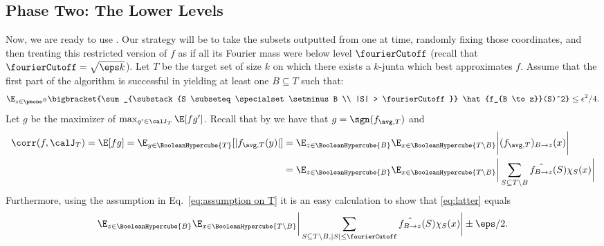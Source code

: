 \subsection{Phase Two: The Lower Levels}
\label{subsection:phase-two-lower-levels}

Now, we are ready to use . Our strategy will be to take the subsets outputted from  one at time, randomly fixing those coordinates, and then treating this restricted version of $f$ as if all its Fourier mass were below level $\fourierCutoff$ (recall that $\fourierCutoff = \sqrt{\eps k}$).
Let $T$ be the target set of size $k$ on which there exists a $k$-junta which best approximates $f$.
Assume that the first part of the algorithm is successful in yielding at least one $B\subseteq T$ such that:
\begin{equation}\label{eq:assumption on T}\E_{z \in \pmone^B}\bigbracket{\sum_{\substack{S \subseteq \specialset \setminus B \\ |S| > \fourierCutoff}} \hat{f_{B \to z}}(S)^2} \leq \epsilon^2/4.\end{equation}
Let $g$ be the maximizer of $\max_{g' \in \calJ_T} \E[fg']$. 
Recall that by  we have that
$g = \sgn(f_{\avg,T})$ and 
\begin{align}
    \corr(f, \calJ_T) = \E[fg] = \E_{y \in \BooleanHypercube{T}} [|f_{\avg, T}(y)|]
     &=\E_{z \in \BooleanHypercube{B}} \E_{x \in \BooleanHypercube{T \setminus B}}\bigg | (f_{\avg, T})_{B \to z}(x)\bigg|\\
     &=\E_{z \in \BooleanHypercube{B}} \E_{x \in \BooleanHypercube{T \setminus B}}
     \bigg | \sum_{S \subseteq T\setminus B} \hat{f_{B \to z}}(S)\chi_S(x)\bigg|\label{eq:latter}
     \end{align}
     Furthermore, using the assumption in Eq.~\eqref{eq:assumption on T} it is an easy calculation to show that \eqref{eq:latter} equals
     $$
     \E_{z \in \BooleanHypercube{B}} \E_{x \in \BooleanHypercube{T \setminus B}}
     \bigg | \sum_{S \subseteq T\setminus B, |S|\le \fourierCutoff} \hat{f_{B \to z}}(S)\chi_S(x)\bigg| \pm \eps/2.
     $$
     
